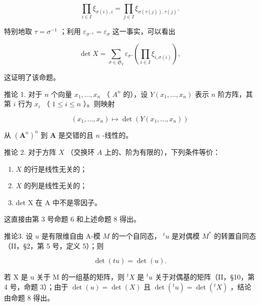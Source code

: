 \[
\prod_ {i \in I} \xi_ {\sigma (i), i} = \prod_ {j \in I} \xi_ {\sigma (\tau (j)), \tau (j)}.
\]

特别地取 \(\tau = \sigma^{-1}\) ；利用 \(\varepsilon_{\sigma^{-1}} = \varepsilon_{\sigma}\) 这一事实，可以看出

\[
\det X = \sum_ {\sigma \in \mathfrak {S} _ {I}} \varepsilon_ {\sigma}. \left(\prod_ {i \in I} \xi_ {i, \sigma (i)}\right),\tag{15}
\]

这证明了该命题。

推论 1. 对于 \(n\) 个向量 \(x_1, \ldots, x_n\) （ \(A^n\) 的），设 \(Y(x_1, \ldots, x_n)\) 表示 \(n\) 阶方阵，其第 \(i\) 行为 \(x_i\) （ \(1 \leqslant i \leqslant n\) ）。则映射

\[
(x _ {1}, \dots , x _ {n}) \mapsto \det (Y (x _ {1}, \dots , x _ {n}))
\]

从 \((\mathbf{A}^n)^n\) 到 \(\mathbf{A}\) 是交错的且 \(n\) -线性的。

推论 2. 对于方阵 \(X\) （交换环 \(A\) 上的、阶为有限的），下列条件等价：

\begin{enumerate}
\def\labelenumi{(\roman{enumi})}
\item
  \(X\) 的行是线性无关的；
\item
  \(X\) 的列是线性无关的；
\item
  det X 在 A 中不是零因子。
\end{enumerate}

这直接由第 3 号命题 6 和上述命题 8 得出。

推论3. 设 \(u\) 是有限维自由 A-模 \(M\) 的一个自同态， \({}^t u\) 是对偶模 \(M^*\) 的转置自同态（II，§2，第 5 号，定义 5）；则

\[
\det (t u) = \det (u).\tag{16}
\]

若 X 是 u 关于 M 的一组基的矩阵，则 \({}^{t}X\) 是 \({}^{t}u\) 关于对偶基的矩阵（II，§10，第 4 号，命题 3）；由于 \(\det(u) = \det(X)\) 且 \(\det(^{t}u) = \det(^{t}X)\) ，结论由命题 8 得出。

